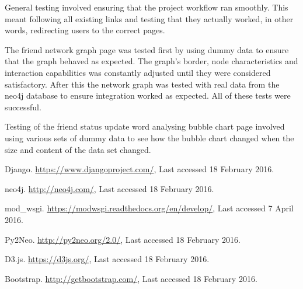 \documentclass[10pt,onecolumn]{article}
\begin{document}
General testing involved ensuring that the project workflow ran smoothly. This meant following all existing links and testing that they actually worked, in other words, redirecting users to the correct pages.

The friend network graph page was tested first by using dummy data to ensure that the graph behaved as expected. The graph's border, node characteristics and interaction capabilities was constantly adjusted until they were considered satisfactory. After this the network graph was tested with real data from the neo4j database to ensure integration worked as expected. All of these tests were successful.

Testing of the friend status update word analysing bubble chart page involved using various sets of dummy data to see how the bubble chart changed when the size and content of the data set changed.

\begin{thebibliography}{1}

  Django. \url{https://www.djangoproject.com/}, Last accessed 18 February 2016.

 neo4j. \url{http://neo4j.com/}, Last accessed 18 February 2016.

 mod\_wsgi. \url{https://modwsgi.readthedocs.org/en/develop/}, Last accessed 7 April 2016.

 Py2Neo. \url{http://py2neo.org/2.0/}, Last accessed 18 February 2016.

 D3.js. \url{https://d3js.org/}, Last accessed 18 February 2016.

 Bootstrap. \url{http://getbootstrap.com/}, Last accessed 18 February 2016.
	
\end{thebibliography}

\clearpage
\end{document}
